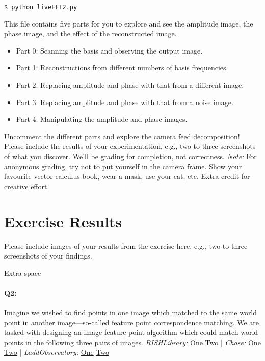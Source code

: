 \begin{verbatim}
$ python liveFFT2.py
\end{verbatim}

This file contains five parts for you to explore and see the amplitude image, the phase image, and the effect of the reconstructed image.
\begin{itemize}
    \item Part 0: Scanning the basis and observing the output image.
    \item Part 1: Reconstructions from different numbers of basis frequencies.
    \item Part 2: Replacing amplitude and phase with that from a different image.
    \item Part 3: Replacing amplitude and phase with that from a noise image.
    \item Part 4: Manipulating the amplitude and phase images.
\end{itemize}

Uncomment the different parts and explore the camera feed decomposition! Please include the results of your experimentation, e.g., two-to-three screenshots of what you discover. We'll be grading for completion, not correctness. \emph{Note:} For anonymous grading, try not to put yourself in the camera frame. Show your favourite vector calculus book, wear a mask, use your cat, etc. Extra credit for creative effort.


\pagebreak
\section*{Exercise Results}
Please include images of your results from the exercise here, e.g., two-to-three screenshots of your findings.



\pagebreak
Extra space





\pagebreak

\paragraph{Q2:} Imagine we wished to find points in one image which matched to the same world point in another image---so-called feature point correspondence matching. We are tasked with designing an image feature point algorithm which could match world points in the following three pairs of images.
\newline
\newline
\emph{RISHLibrary:} \href{RISHLibrary1.jpg}{One} \href{RISHLibrary2.jpg}{Two} | \emph{Chase:} \href{Chase1.jpg}{One} \href{Chase2.jpg}{Two} | \emph{LaddObservatory:} \href{LaddObservatory1.jpg}{One} \href{LaddObservatory2.jpg}{Two}

